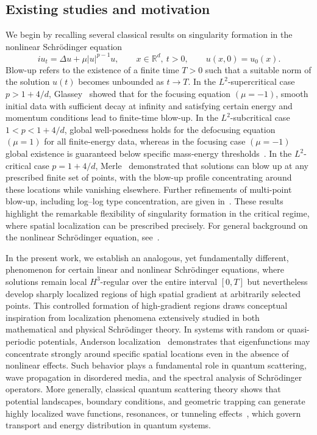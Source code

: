 \documentclass[11pt,reqno,oneside]{amsart}
\numberwithin{equation}{section}
\theoremstyle{definition}
\theoremstyle{remark}
\numberwithin{equation}{section}
\begin{document}
\iffalse
 	
 	\subsection{Existing studies and motivation}
 	
 	We begin by recalling several classical results on singularity formation in the nonlinear Schr\"odinger equation
 	\begin{equation*}
 		i u_t = \Delta u + \mu |u|^{p-1} u, \qquad x \in \mathbb{R}^d, \ t>0, \qquad u(x,0)=u_0(x).
 	\end{equation*}
 	Blow-up refers to the existence of a finite time \(T>0\) such that a suitable norm of the solution \(u(t)\) becomes unbounded as \(t \to T\). In the \(L^2\)-supercritical case \(p>1+4/d\), Glassey~\cite{Glassey1977Blowup} showed that for the focusing equation \((\mu=-1)\), smooth initial data with sufficient decay at infinity and satisfying certain energy and momentum conditions lead to finite-time blow-up. In the \(L^2\)-subcritical case \(1<p<1+4/d\), global well-posedness holds for the defocusing equation \((\mu=1)\) for all finite-energy data, whereas in the focusing case \((\mu=-1)\) global existence is guaranteed below specific mass-energy thresholds~\cite{GinibreVelo1979NLS}. In the \(L^2\)-critical case \(p=1+4/d\), Merle~\cite{Merle1990kBlowup} demonstrated that solutions can blow up at any prescribed finite set of points, with the blow-up profile concentrating around these locations while vanishing elsewhere. Further refinements of multi-point blow-up, including log--log type concentration, are given in~\cite{Fan2017LogLogMultiPoint}. These results highlight the remarkable flexibility of singularity formation in the critical regime, where spatial localization can be prescribed precisely. For general background on the nonlinear Schr\"odinger equation, see~\cite{Tao2006NDE,SulemSulemNLS,Cazenave2003Semilinear}.
 	
 	In the present work, we establish an analogous, yet fundamentally different,
 	phenomenon for certain linear and nonlinear Schr\"odinger equations, where
 	solutions remain local \(H^3\)-regular over the entire interval \([0,T]\) but
 	nevertheless develop sharply localized regions of high spatial gradient at
 	arbitrarily selected points. This controlled formation of high-gradient regions
 	draws conceptual inspiration from localization phenomena extensively studied in
 	both mathematical and physical Schr\"odinger theory. In systems with random or
 	quasi-periodic potentials, Anderson localization~\cite{Anderson1958, Cycon1987}
 	demonstrates that eigenfunctions may concentrate strongly around specific
 	spatial locations even in the absence of nonlinear effects. Such behavior plays
 	a fundamental role in quantum scattering, wave propagation in disordered media,
 	and the spectral analysis of Schr\"odinger operators. More generally, classical
 	quantum scattering theory shows that potential landscapes, boundary conditions,
 	and geometric trapping can generate highly localized wave functions,
 	resonances, or tunneling effects~\cite{Taylor1972, Yafaev1992, ReedSimon3}, which
 	govern transport and energy distribution in quantum systems.
 	
\end{document}
